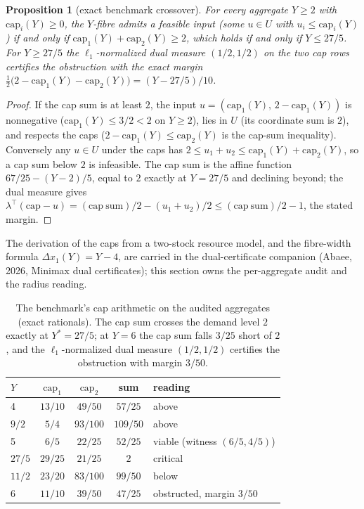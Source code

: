 \documentclass[10pt,twocolumn]{article}
\theoremstyle{plain}
\newtheorem{proposition}[theorem]{Proposition}
\theoremstyle{definition}
\theoremstyle{remark}
\begin{document}
\begin{proposition}[exact benchmark crossover]\label{audit-prop:bench}
For every aggregate \(Y \ge 2\) with \(\mathrm{cap}_i(Y) \ge 0\), the
\(Y\)-fibre admits a feasible input (some \(u \in U\) with
\(u_i \le \mathrm{cap}_i(Y)\)) if and only if
\(\mathrm{cap}_1(Y) + \mathrm{cap}_2(Y) \ge 2\), which holds if and
only if \(Y \le 27/5\). For \(Y \ge 27/5\) the
\(\ell_1\)-normalized dual measure \((1/2, 1/2)\) on the two cap rows
certifies the obstruction with the exact margin
\(\tfrac12\bigl(2 - \mathrm{cap}_1(Y) - \mathrm{cap}_2(Y)\bigr) =
(Y - 27/5)/10\).
\end{proposition}

\begin{proof}
If the cap sum is at least \(2\), the input
\(u = (\mathrm{cap}_1(Y),\, 2 - \mathrm{cap}_1(Y))\) is nonnegative
(\(\mathrm{cap}_1(Y) \le 3/2 < 2\) on \(Y \ge 2\)), lies in
\(U\) (its coordinate sum is \(2\)), and respects the caps
(\(2 - \mathrm{cap}_1(Y) \le \mathrm{cap}_2(Y)\) is the cap-sum
inequality). Conversely any \(u \in U\) under the caps has
\(2 \le u_1 + u_2 \le \mathrm{cap}_1(Y) + \mathrm{cap}_2(Y)\), so a
cap sum below \(2\) is infeasible. The cap sum is the affine function
\(67/25 - (Y - 2)/5\), equal to \(2\) exactly at \(Y = 27/5\) and
declining beyond; the dual measure gives
\(\lambda^\top(\mathrm{cap} - u) = (\mathrm{cap\ sum})/2 -
(u_1 + u_2)/2 \le (\mathrm{cap\ sum})/2 - 1\), the stated margin.
\end{proof}

The derivation of the caps from a two-stock resource model, and the
fibre-width formula \(\Delta x_1(Y) = Y - 4\), are carried in the
dual-certificate companion (Abaee, 2026, Minimax dual certificates); this section owns the
per-aggregate audit and the radius reading.

\begin{table}[t]
\centering
\footnotesize
\caption{The benchmark's cap arithmetic on the audited aggregates
(exact rationals). The cap sum crosses the demand level \(2\) exactly
at \(Y^{*} = 27/5\); at \(Y = 6\) the cap sum falls \(3/25\) short of
\(2\), and the \(\ell_1\)-normalized dual measure \((1/2, 1/2)\) certifies the
obstruction with margin \(3/50\).}
\label{audit-tab:bench}
\begin{tabular}{@{}l c c c l@{}}
\toprule
\(Y\) & \(\mathrm{cap}_1\) & \(\mathrm{cap}_2\) & sum & reading\\
\midrule
4 & $13/10$ & $49/50$ & $57/25$ & above\\
$9/2$ & $5/4$ & $93/100$ & $109/50$ & above\\
5 & $6/5$ & $22/25$ & $52/25$ & viable (witness $(6/5, 4/5)$)\\
$27/5$ & $29/25$ & $21/25$ & $2$ & critical\\
$11/2$ & $23/20$ & $83/100$ & $99/50$ & below\\
6 & $11/10$ & $39/50$ & $47/25$ & obstructed, margin $3/50$\\
\bottomrule
\end{tabular}
\end{table}
\end{document}

